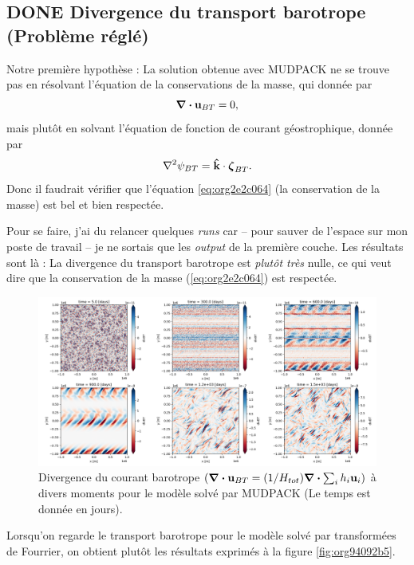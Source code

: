 \documentclass[10pt]{article}
\numberwithin{equation}{section}
\newcommand{\kvf}{\vb{\hat{k}}}
\newcommand{\uu}{\vb{u}}
\begin{document}
\subsection{{\bfseries\sffamily DONE} Divergence du transport barotrope (Problème réglé)}
\label{sec:org6b0f934}
Notre première hypothèse : La solution obtenue avec MUDPACK ne se trouve pas en résolvant l'équation de la conservations de la masse, qui donnée par
\begin{equation}
\label{eq:org2e2c064}
   \div{\uu_{BT}} = 0,
\end{equation}
mais plutôt en solvant l'équation de fonction de courant géostrophique, donnée par
\begin{equation}
   \laplacian{\psi_{BT}} = \kvf \cdot \boldsymbol{\zeta}_{BT}.
\end{equation}
Donc il faudrait vérifier que l'équation \ref{eq:org2e2c064} (la conservation de la masse) est bel et bien respectée.\bigskip

Pour se faire, j'ai du relancer quelques \emph{runs} car -- pour sauver de l'espace sur mon poste de travail -- je ne sortais que les \emph{output} de la première couche.
Les résultats sont là :
La divergence du transport barotrope est \emph{plutôt très} nulle, ce qui veut dire que la conservation de la masse (\ref{eq:org2e2c064}) est respectée.

\begin{figure}[!htpb]
\centering
\includegraphics[width=.9\linewidth]{figures/debuggage/2023_06_21divBT1_MUD.png}
\caption{\label{fig:orgaadfbe1}Divergence du courant barotrope \(\qty(\div{\uu_{BT}} = \qty(1/H_{tot}) \div{\sum_i h_i \uu_i})\) à divers moments pour le modèle solvé par MUDPACK (Le temps est donnée en jours).}
\end{figure}

Lorsqu'on regarde le transport barotrope pour le modèle solvé par transformées de Fourrier, on obtient plutôt les résultats exprimés à la figure \ref{fig:org94092b5}. 
\end{document}
